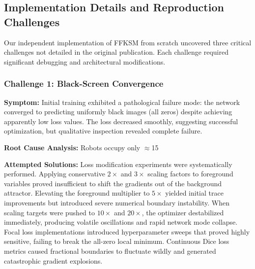 \documentclass[12pt,a4paper,oneside]{report}
\begin{document}
\subsection{Implementation Details and Reproduction Challenges}

Our independent implementation of FFKSM from scratch uncovered three critical challenges not detailed in the original publication. Each challenge required significant debugging and architectural modifications.

\subsubsection{Challenge 1: Black-Screen Convergence}

\textbf{Symptom:} Initial training exhibited a pathological failure mode: the network converged to predicting uniformly black images (all zeros) despite achieving apparently low loss values. The loss decreased smoothly, suggesting successful optimization, but qualitative inspection revealed complete failure.

\textbf{Root Cause Analysis:} Robots occupy only $\approx$15%

\textbf{Attempted Solutions:} Loss modification experiments were systematically performed. Applying conservative $2\times$ and $3\times$ scaling factors to foreground variables proved insufficient to shift the gradients out of the background attractor. Elevating the foreground multiplier to $5\times$ yielded initial trace improvements but introduced severe numerical boundary instability. When scaling targets were pushed to $10\times$ and $20\times$, the optimizer destabilized immediately, producing volatile oscillations and rapid network mode collapse. Focal loss implementations introduced hyperparameter sweeps that proved highly sensitive, failing to break the all-zero local minimum. Continuous Dice loss metrics caused fractional boundaries to fluctuate wildly and generated catastrophic gradient explosions.
\end{document}
